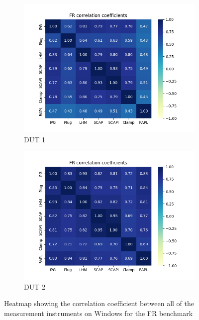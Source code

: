 \begin{figure}[H]
    \centering
    \begin{subfigure}[b]{0.49\textwidth}
        \centering
        \includegraphics[width=\textwidth]{figures/Fannkuch-reduxDut1.png}
        \caption{DUT 1}
    \end{subfigure}
    \hfill
    \begin{subfigure}[b]{0.49\textwidth}
        \centering
        \includegraphics[width=\textwidth]{figures/Fannkuch-reduxDut2.png}
        \caption{DUT 2}
    \end{subfigure}
    \caption{Heatmap showing the correlation coefficient between all of the measurement instruments on Windows for the FR benchmark}
\end{figure}

